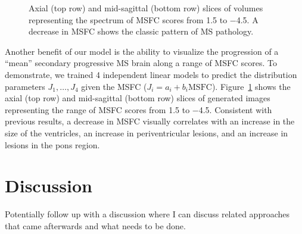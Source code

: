 \begin{figure}[tb]
\centering
{}
\caption[Axial and mid-sagittal slices of volumes representing the spectrum of
MSFC scores]{Axial (top row) and mid-sagittal (bottom row) slices of volumes
representing the spectrum of MSFC scores from \num{1.5} to \num{-4.5}. A
decrease in MSFC shows the classic pattern of MS pathology.}
\label{fig:msspectrum}
\end{figure}

Another benefit of our model is the ability to visualize the progression of a
``mean'' secondary progressive MS brain along a range of MSFC scores.
To demonstrate, we trained 4 independent linear models to predict the
distribution parameters $J_1, \dotsc, J_4$ given the MSFC ($J_i = a_i +
b_i\text{MSFC}$). Figure~\ref{fig:msspectrum} shows the axial (top row) and
mid-sagittal (bottom row) slices of generated images representing the range of
MSFC scores from \num{1.5} to \num{-4.5}. Consistent with previous results, a
decrease in MSFC visually correlates with an increase in the size of the
ventricles, an increase in periventricular lesions, and an increase in lesions
in the pons region.

\section{Discussion}

Potentially follow up with a discussion where I can discuss related approaches
that came afterwards and what needs to be done.

